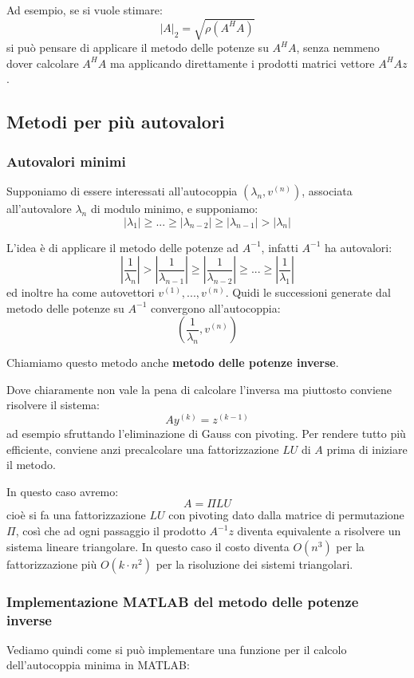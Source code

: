 \documentclass[a4paper,11pt]{article}
\begin{document}
Ad esempio, se si vuole stimare:
$$
|A|_2 = \sqrt{\rho(A^H A)}
$$
si può pensare di applicare il metodo delle potenze su $A^H A$, senza nemmeno dover calcolare $A^H A$ ma applicando direttamente i prodotti matrici vettore $A^H A z$.

\subsection{Metodi per più autovalori}
\subsubsection{Autovalori minimi}
Supponiamo di essere interessati all'autocoppia $(\lambda_n, v^{(n)})$, associata all'autovalore $\lambda_n$ di modulo minimo, e supponiamo:
$$
|\lambda_1| \geq ... \geq |\lambda_{n - 2}| \geq |\lambda_{n - 1}| > |\lambda_n|
$$

L'idea è di applicare il metodo delle potenze ad $A^{-1}$, infatti $A^{-1}$ ha autovalori:
$$
\left| \frac{1}{\lambda_n} \right| > \left| \frac{1}{\lambda_{n - 1}} \right| \geq \left| \frac{1}{\lambda_{n - 2}} \right| \geq ... \geq \left| \frac{1}{\lambda_1} \right|
$$
ed inoltre ha come autovettori $v^{(1)}, ..., v^{(n)}$.
Quidi le successioni generate dal metodo delle potenze su $A^{-1}$ convergono all'autocoppia:
$$
\left( \frac{1}{\lambda_n}, v^{(n)} \right)
$$

Chiamiamo questo metodo anche \textbf{metodo delle potenze inverse}.

Dove chiaramente non vale la pena di calcolare l'inversa ma piuttosto conviene risolvere il sistema:
$$
A y^{(k)} = z^{(k - 1)}
$$
ad esempio sfruttando l'eliminazione di Gauss con pivoting.
Per rendere tutto più efficiente, conviene anzi precalcolare una fattorizzazione $LU$ di $A$ prima di iniziare il metodo.

In questo caso avremo:
$$
A = \Pi LU
$$
cioè si fa una fattorizzazione $LU$ con pivoting dato dalla matrice di permutazione $\Pi$, così che ad ogni passaggio il prodotto $A^{-1} z$ diventa equivalente a risolvere un sistema lineare triangolare.
In questo caso il costo diventa $O(n^3)$ per la fattorizzazione più $O(k \cdot n^2)$ per la risoluzione dei sistemi triangolari.

\subsubsection{Implementazione MATLAB del metodo delle potenze inverse}
Vediamo quindi come si può implementare una funzione per il calcolo dell'autocoppia minima in MATLAB:
\lstset{style=codestyle, language=MATLAB}

\end{document}
